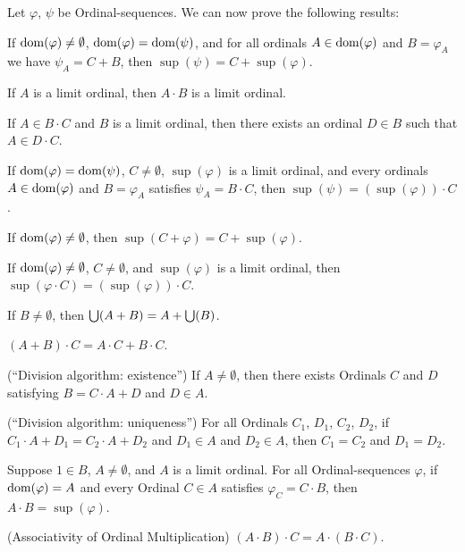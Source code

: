 \documentclass{article}
\begin{document}
Let $\varphi$, $\psi$ be Ordinal-sequences. We can now prove the
following results:
\begin{thm}
\item\label{ordinal3:39} If $\operatorname{dom}(\varphi)\neq\emptyset$,
  $\operatorname{dom}(\varphi)=\operatorname{dom}(\psi)$, and for all ordinals $A\in\operatorname{dom}(\varphi)$
  and $B=\varphi_{A}$ we have $\psi_{A}=C+B$,
  then $\sup(\psi)=C+\sup(\varphi)$.
\item\label{ordinal3:40} If $A$ is a limit ordinal, then  $A\cdot B$ is
  a limit ordinal.
\item\label{ordinal3:41} If $A\in B\cdot C$ and $B$ is a limit ordinal,
  then there exists an ordinal $D\in B$ such that $A\in D\cdot C$.
\item\label{ordinal3:42} If $\operatorname{dom}(\varphi)=\operatorname{dom}(\psi)$, $C\neq\emptyset$,
  $\sup(\varphi)$ is a limit ordinal, and every ordinals
  $A\in\operatorname{dom}(\varphi)$ and $B=\varphi_{A}$ satisfies $\psi_{A}=B\cdot C$,
  then $\sup(\psi)=(\sup(\varphi))\cdot C$.
\item\label{ordinal3:43} If $\operatorname{dom}(\varphi)\neq\emptyset$, then $\sup(C+\varphi)=C+\sup(\varphi)$.
\item\label{ordinal3:44} If $\operatorname{dom}(\varphi)\neq\emptyset$, $C\neq\emptyset$,
  and $\sup(\varphi)$ is a limit ordinal, then $\sup(\varphi\cdot C)=(\sup(\varphi))\cdot C$.
\item\label{ordinal3:45} If $B\neq\emptyset$, then $\bigcup(A+B)=A+\bigcup(B)$.
\item\label{ordinal3:46} $(A+B)\cdot C=A\cdot C+B\cdot C$.
\item\label{ordinal3:47} (``Division algorithm: existence'') If $A\neq\emptyset$,
  then there exists Ordinals $C$ and $D$ satisfying $B=C\cdot A+D$ and $D\in A$.
\item\label{ordinal3:48} (``Division algorithm: uniqueness'') For all Ordinals $C_{1}$, $D_{1}$, $C_{2}$, $D_{2}$,
  if $C_{1}\cdot A+D_{1}=C_{2}\cdot A+D_{2}$ and $D_{1}\in A$ and
  $D_{2}\in A$, then $C_{1}=C_{2}$ and $D_{1}=D_{2}$.
\item\label{ordinal3:49} Suppose $1\in B$, $A\neq\emptyset$, and $A$ is a
  limit ordinal. For all Ordinal-sequences $\varphi$, if $\operatorname{dom}(\varphi)=A$
  and every Ordinal $C\in A$ satisfies $\varphi_{C}=C\cdot B$,
  then $A\cdot B=\sup(\varphi)$.
\item\label{ordinal3:50} (Associativity of Ordinal Multiplication) $(A\cdot B)\cdot C=A\cdot(B\cdot C)$.
\end{thm}
\end{document}

